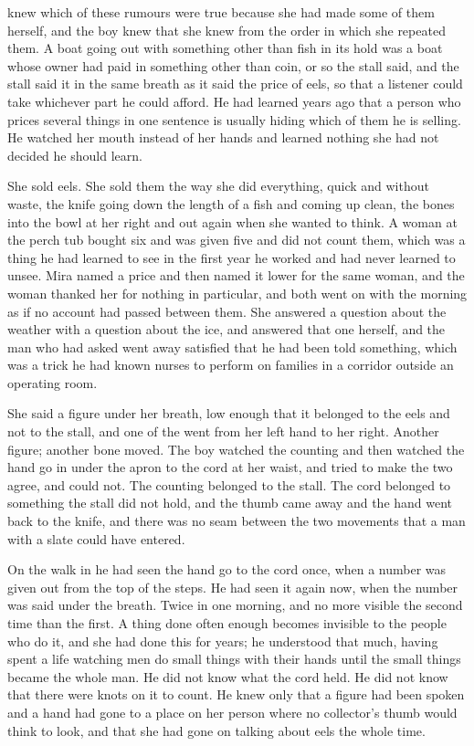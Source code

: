  knew which of these rumours were true because she had made some of them herself, and the boy knew that she knew from the order in which she repeated them. A boat going out with something other than fish in its hold was a boat whose owner had paid  in something other than coin, or so the stall said, and the stall said it in the same breath as it said the price of eels, so that a listener could take whichever part he could afford. He had learned years ago that a person who prices several things in one sentence is usually hiding which of them he is selling. He watched her mouth instead of her hands and learned nothing she had not decided he should learn.

She sold eels. She sold them the way she did everything, quick and without waste, the knife going down the length of a fish and coming up clean, the bones into the bowl at her right and out again when she wanted to think. A woman at the perch tub bought six and was given five and did not count them, which was a thing he had learned to see in the first year he worked and had never learned to unsee. Mira named a price and then named it lower for the same woman, and the woman thanked her for nothing in particular, and both went on with the morning as if no account had passed between them. She answered a question about the weather with a question about the ice, and answered that one herself, and the man who had asked went away satisfied that he had been told something, which was a trick he had known nurses to perform on families in a corridor outside an operating room.

She said a figure under her breath, low enough that it belonged to the eels and not to the stall, and one of the  went from her left hand to her right. Another figure; another bone moved. The boy watched the counting and then watched the hand go in under the apron to the cord at her waist, and tried to make the two agree, and could not. The counting belonged to the stall. The cord belonged to something the stall did not hold, and the thumb came away and the hand went back to the knife, and there was no seam between the two movements that a man with a slate could have entered.

On the walk in he had seen the hand go to the cord once, when a number was given out from the top of the steps. He had seen it again now, when the number was said under the breath. Twice in one morning, and no more visible the second time than the first. A thing done often enough becomes invisible to the people who do it, and she had done this for years; he understood that much, having spent a life watching men do small things with their hands until the small things became the whole man. He did not know what the cord held. He did not know that there were knots on it to count. He knew only that a figure had been spoken and a hand had gone to a place on her person where no collector's thumb would think to look, and that she had gone on talking about eels the whole time.


